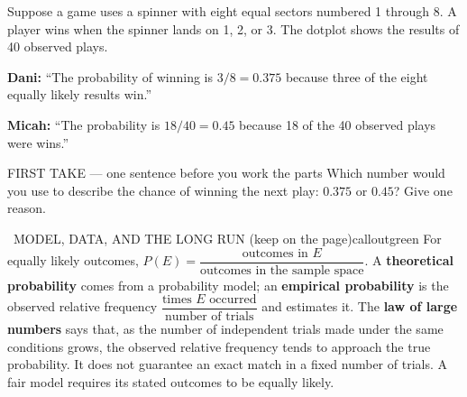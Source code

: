 \documentclass[11pt]{article}
\begin{document}


Suppose a game uses a spinner with eight equal sectors numbered 1 through 8. A player wins when the spinner lands on 1, 2, or 3. The dotplot shows the results of 40 observed plays.\par\smallskip \textbf{Dani:} ``The probability of winning is $3/8=0.375$ because three of the eight equally likely results win.''\par \textbf{Micah:} ``The probability is $18/40=0.45$ because 18 of the 40 observed plays were wins.''\par
\begin{center}
\end{center}
\begin{firsttakebox}{FIRST TAKE --- one sentence before you work the parts}
Which number would you use to describe the chance of winning the next play: $0.375$ or $0.45$? Give one reason.
\workspace{0.9in}
\end{firsttakebox}

\begin{callout}{\IconBook\ MODEL, DATA, AND THE LONG RUN (keep on the page)}{calloutgreen}
For equally likely outcomes, $P(E)=\dfrac{\text{outcomes in }E}{\text{outcomes in the sample space}}$.
A \textbf{theoretical probability} comes from a probability model; an \textbf{empirical probability}
is the observed relative frequency $\dfrac{\text{times }E\text{ occurred}}{\text{number of trials}}$ and estimates it.
The \textbf{law of large numbers} says that, as the number of independent trials made under the same
conditions grows, the observed relative frequency tends to approach the true probability. It does not
guarantee an exact match in a fixed number of trials. A fair model requires its stated outcomes to be equally likely.
\end{callout}
\end{document}
